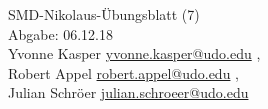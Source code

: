 


\begin{center}
{\huge SMD-Nikolaus-Übungsblatt (7) } \\
\vspace{1cm}
Abgabe: 06.12.18 \\
\vspace{.5cm}
  Yvonne Kasper
  \texorpdfstring{
    \href{mailto:authorA@udo.edu}{yvonne.kasper@udo.edu}
  }{},\\
  Robert Appel%
  \texorpdfstring{
    \href{mailto:authorB@udo.edu}{robert.appel@udo.edu}
  }{},\\
  Julian Schröer%
  \texorpdfstring{
    \href{mailto:authorB@udo.edu}{julian.schroeer@udo.edu}
  }{}
\end{center}





\printbibliography


